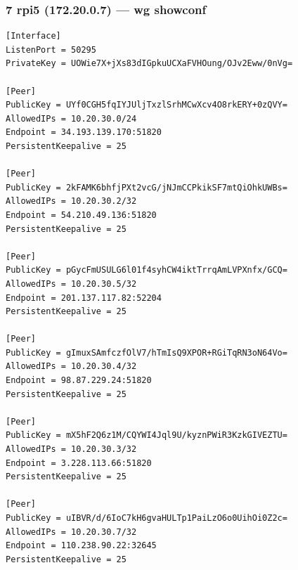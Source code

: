 \documentclass[11pt,a4paper]{article}
\begin{document}
\subsubsection*{7 rpi5 (172.20.0.7) — wg showconf}
\begin{lstlisting}
[Interface]
ListenPort = 50295
PrivateKey = UOWie7X+jXs83dIGpkuUCXaFVHOung/OJv2Eww/0nVg=

[Peer]
PublicKey = UYf0CGH5fqIYJUljTxzlSrhMCwXcv4O8rkERY+0zQVY=
AllowedIPs = 10.20.30.0/24
Endpoint = 34.193.139.170:51820
PersistentKeepalive = 25

[Peer]
PublicKey = 2kFAMK6bhfjPXt2vcG/jNJmCCPkikSF7mtQiOhkUWBs=
AllowedIPs = 10.20.30.2/32
Endpoint = 54.210.49.136:51820
PersistentKeepalive = 25

[Peer]
PublicKey = pGycFmUSULG6l01f4syhCW4iktTrrqAmLVPXnfx/GCQ=
AllowedIPs = 10.20.30.5/32
Endpoint = 201.137.117.82:52204
PersistentKeepalive = 25

[Peer]
PublicKey = gImuxSAmfczfOlV7/hTmIsQ9XPOR+RGiTqRN3oN64Vo=
AllowedIPs = 10.20.30.4/32
Endpoint = 98.87.229.24:51820
PersistentKeepalive = 25

[Peer]
PublicKey = mX5hF2Q6z1M/CQYWI4Jql9U/kyznPWiR3KzkGIVEZTU=
AllowedIPs = 10.20.30.3/32
Endpoint = 3.228.113.66:51820
PersistentKeepalive = 25

[Peer]
PublicKey = uIBVR/d/6IoC7kH6gvaHULTp1PaiLzO6o0UihOi0Z2c=
AllowedIPs = 10.20.30.7/32
Endpoint = 110.238.90.22:32645
PersistentKeepalive = 25

\end{lstlisting}
\end{document}
